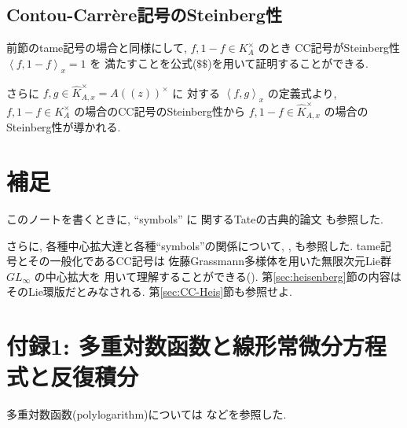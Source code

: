 \documentclass[12pt,twoside]{jarticle}
\theoremstyle{definition} %
\theoremstyle{definition} %
\theoremstyle{definition} %
\numberwithin{theorem}{section}
\numberwithin{equation}{section}
\numberwithin{figure}{section}
\numberwithin{table}{section}
\newcommand\secref[1]{第\ref{#1}節}
\newcommand\Khat{{\widehat K}}
\newcommand\CC[3]{\left\langle #2,#3\right\rangle_{#1}}
\begin{document}

\subsection{Contou-Carr\`ere記号のSteinberg性}

前節のtame記号の場合と同様にして, 
$f,1-f\in K_A^\times$ のとき
CC記号がSteinberg性 $\CC{x}{f}{1-f}=1$ を
満たすことを公式($\$\$$)を用いて証明することができる.

さらに $f,g\in\Khat_{A,x}^\times=A((z))^\times$ に
対する $\CC{x}{f}{g}$ の定義式より, 
$f,1-f\in K_A^\times$ の場合のCC記号のSteinberg性から 
$f,1-f\in \Khat_{A,x}^\times$ の場合のSteinberg性が導かれる.


\section{補足}

このノートを書くときに, ``symbols'' に
関するTateの古典的論文 \cite{tate} も参照した.

さらに, 各種中心拡大達と各種``symbols''の関係について, 
\cite{brylinski},
\cite{anderson-pablosromo}
も参照した. tame記号とその一般化であるCC記号は
佐藤Grassmann多様体を用いた無限次元Lie群 $GL_\infty$ の中心拡大を
用いて理解することができる(\cite{anderson-pablosromo}).
\secref{sec:heisenberg}の内容はそのLie環版だとみなされる.
\secref{sec:CC-Heis}も参照せよ.


\section{付録1: 多重対数函数と線形常微分方程式と反復積分}
\label{sec:polylog}

多重対数函数(polylogarithm)については \cite{hain} などを参照した.
\end{document}
